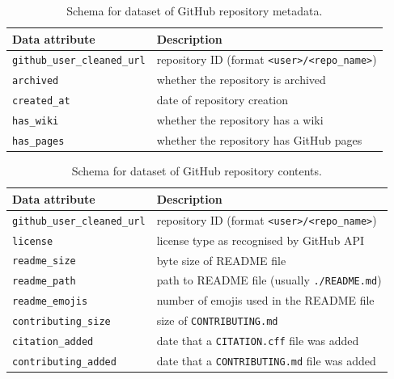 \documentclass[10pt,a4paper]{scrartcl}
\begin{document}

\begin{table}
    \centering
    \begin{tabular}{l|l}
        \hline
        Data attribute & Description \\
        \hline
        \verb|github_user_cleaned_url| & repository ID (format \verb|<user>/<repo_name>|) \\
        \verb|archived| & whether the repository is archived \\
        \verb|created_at| & date of repository creation \\
        \verb|has_wiki| & whether the repository has a wiki \\
        \verb|has_pages| & whether the repository has GitHub pages \\
        \hline
    \end{tabular}
    \caption{Schema for dataset of GitHub repository metadata.}
    \label{table:metadata}
\end{table}

\begin{table}
    \centering
    \begin{tabular}{l|l}
        \hline
        Data attribute & Description \\
        \hline
        \verb|github_user_cleaned_url| & repository ID (format \verb|<user>/<repo_name>|) \\
        \verb|license| & license type as recognised by GitHub API \\
        \verb|readme_size| & byte size of README file \\
        \verb|readme_path| & path to README file (usually \verb|./README.md|) \\
        \verb|readme_emojis| & number of emojis used in the README file \\
        \verb|contributing_size| & size of \verb|CONTRIBUTING.md| \\
        \verb|citation_added| & date that a \verb|CITATION.cff| file was added \\
        \verb|contributing_added| & date that a \verb|CONTRIBUTING.md| file was added \\
        \hline
    \end{tabular}
    \caption{Schema for dataset of GitHub repository contents.}
    \label{table:contents}
\end{table}
\end{document}

